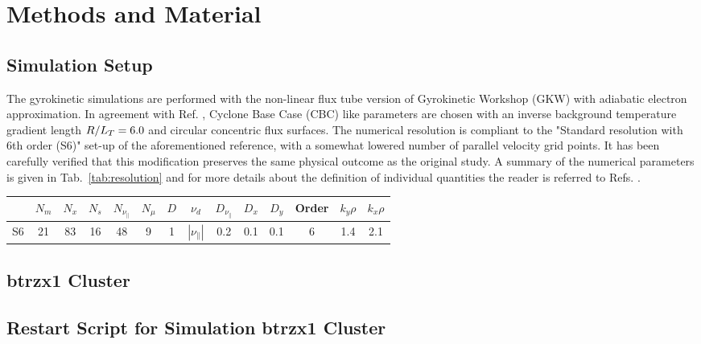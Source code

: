 
\chapter{Methods and Material}
\label{chap:methods}
\thispagestyle{empty}
\newpage

\section{Simulation Setup}
\label{sec:simulation}

The gyrokinetic simulations are performed with the non-linear flux tube version of Gyrokinetic Workshop (GKW) \cite{peeters2009} with adiabatic electron approximation.
In agreement with Ref. , Cyclone Base Case (CBC) like parameters are chosen with an inverse background temperature gradient length $R/L_T = 6.0$ and circular concentric flux surfaces. 
The numerical resolution is compliant to the "Standard resolution with 6th order (S6)" set-up of the aforementioned reference, with a somewhat lowered number of parallel velocity grid points.
It has been carefully verified that this modification preserves the same physical outcome as the original study.
A summary of the numerical parameters is given in Tab.~\ref{tab:resolution} and for more details about the definition of individual quantities the reader is referred to Refs. .
\begin{center}
	\captionsetup{type=table}
	\begin{tabular}{l | ccccc | ccccc | c | cc}
		& $N_m$ & $N_x$ & $N_s$ & $N_{\nu_\parallel}$ & $N_\mu$ & $D$ & $\nu_d$           & $D_{\nu_\parallel}$ & $D_x$ & $D_y$ & Order & $k_y\rho$ & $k_x\rho$ \\
		\hline
		S6   & 21    & 83    & 16    & 48                  & 9       & 1   & $|\nu_\parallel|$ & 0.2                 & 0.1   & 0.1   & 6     & 1.4       & 2.1       \\
	\end{tabular}
	\label{tab:resolution}
\end{center}

\section{btrzx1 Cluster}
\label{sec:cluster}

\section{Restart Script for Simulation btrzx1 Cluster}
\label{sec:restartscript}